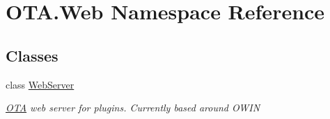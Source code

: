 \hypertarget{namespaceOTA_1_1Web}{}\section{O\+T\+A.\+Web Namespace Reference}
\label{namespaceOTA_1_1Web}
\subsection*{Classes}
\begin{DoxyCompactItemize}
\item 
class \hyperlink{classOTA_1_1Web_1_1WebServer}{Web\+Server}
\begin{DoxyCompactList}\small\item\em \hyperlink{namespaceOTA}{O\+T\+A} web server for plugins. Currently based around O\+W\+I\+N \end{DoxyCompactList}\end{DoxyCompactItemize}
